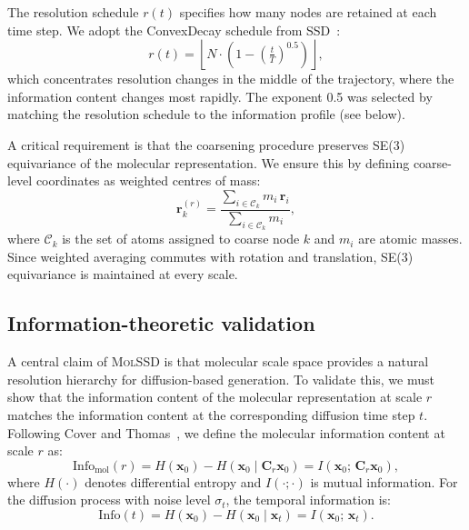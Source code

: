 \documentclass[11pt]{article}
\newcommand{\molssd}{\textsc{MolSSD}}
\newcommand{\vx}{\mathbf{x}}
\newcommand{\mC}{\mathbf{C}}
\newcommand{\info}{\mathrm{Info}}
\begin{document}
The resolution schedule $r(t)$ specifies how many nodes are retained at each time step. We adopt the ConvexDecay schedule from SSD~\cite{ssd2026}:
\begin{equation}
\label{eq:schedule}
    r(t) = \left\lfloor N \cdot \left(1 - \left(\tfrac{t}{T}\right)^{0.5}\right) \right\rfloor,
\end{equation}
which concentrates resolution changes in the middle of the trajectory, where the information content changes most rapidly. The exponent 0.5 was selected by matching the resolution schedule to the information profile (see below).

A critical requirement is that the coarsening procedure preserves SE(3) equivariance of the molecular representation. We ensure this by defining coarse-level coordinates as weighted centres of mass:
\begin{equation}
    \mathbf{r}_k^{(r)} = \frac{\sum_{i \in \mathcal{C}_k} m_i\, \mathbf{r}_i}{\sum_{i \in \mathcal{C}_k} m_i},
\end{equation}
where $\mathcal{C}_k$ is the set of atoms assigned to coarse node $k$ and $m_i$ are atomic masses. Since weighted averaging commutes with rotation and translation, SE(3) equivariance is maintained at every scale.


\subsection*{Information-theoretic validation}

A central claim of \molssd{} is that molecular scale space provides a natural resolution hierarchy for diffusion-based generation. To validate this, we must show that the information content of the molecular representation at scale $r$ matches the information content at the corresponding diffusion time step $t$. Following Cover and Thomas~\cite{cover2006information}, we define the molecular information content at scale $r$ as:
\begin{equation}
\label{eq:info_mol}
    \info_{\text{mol}}(r) = H(\vx_0) - H(\vx_0 \mid \mC_r \vx_0) = I(\vx_0;\, \mC_r \vx_0),
\end{equation}
where $H(\cdot)$ denotes differential entropy and $I(\cdot;\cdot)$ is mutual information. For the diffusion process with noise level $\sigma_t$, the temporal information is:
\begin{equation}
\label{eq:info_t}
    \info(t) = H(\vx_0) - H(\vx_0 \mid \vx_t) = I(\vx_0;\, \vx_t).
\end{equation}
\end{document}
